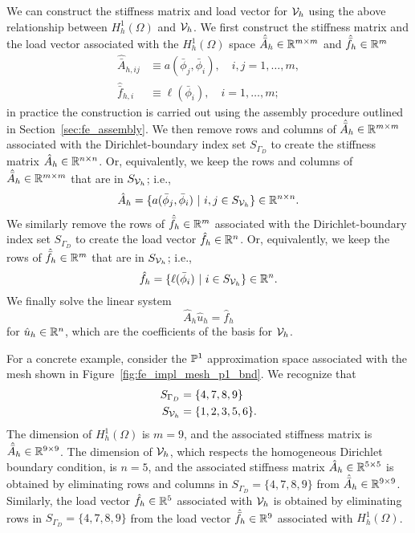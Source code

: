 We can construct the stiffness matrix and load vector for $\mathcal{V}_h$ using the above relationship between $H^1_h(\Omega)$ and $\mathcal{V}_h$.  We first construct the stiffness matrix and the load vector associated with the $H^1_h(\Omega)$ space $\hat{\bar{A}}_h \in \mathbb{R}^{m \times m}$ and $\hat{\bar{f}}_h \in \mathbb{R}^m$
\begin{align*}
  \hat{\bar{A}}_{h,ij} &\equiv a(\bar \phi_j,\bar \phi_i), \quad i,j = 1,\dots,m,\\
  \hat{\bar{f}}_{h,i} &\equiv \ell(\bar \phi_i), \quad i = 1,\dots,m;
\end{align*}
in practice the construction is carried out using the assembly procedure outlined in Section~\ref{sec:fe_assembly}. We then remove rows and columns of $\hat{\bar{A}}_{h} \in \mathbb{R}^{m \times m}$ associated with the Dirichlet-boundary index set $S_{\Gamma_D}$ to create the stiffness matrix $\hat A_h \in \mathbb{R}^{n \times n}$. Or, equivalently, we keep the rows and columns of $\hat{\bar A}_h \in \mathbb{R}^{m \times m}$ that are in $S_{\mathcal{V}_h}$; i.e.,
\begin{equation}
  \hat A_h  = \{ a(\bar \phi_j, \bar \phi_i) \ | \ i,j \in S_{\mathcal{V}_h} \}\in \mathbb{R}^{n \times n}.
  \label{eq:fe_impl_hatAh_dir}
\end{equation}
We similarly remove the rows of $\hat{\bar{f}}_h \in \mathbb{R}^m$ associated with the Dirichlet-boundary index set $S_{\Gamma_D}$ to create the load vector $\hat f_h \in \mathbb{R}^n$. Or, equivalently, we keep the rows of $\hat{\bar f}_h \in \mathbb{R}^{m}$ that are in $S_{\mathcal{V}_h}$; i.e.,
\begin{equation}
  \hat f_h  = \{ \ell(\bar \phi_i) \ | \ i \in S_{\mathcal{V}_h} \}\in \mathbb{R}^{n}.
  \label{eq:fe_impl_hatfh_dir}
\end{equation}
We finally solve the linear system
\begin{equation*}
  \hat A_h \hat u_h = \hat f_h
\end{equation*}
for $\hat u_h \in \mathbb{R}^n$, which are the coefficients of the basis for $\mathcal{V}_h$.

For a concrete example, consider the $\mathbb{P}^1$ approximation space associated with the mesh shown in Figure~\ref{fig:fe_impl_mesh_p1_bnd}. We recognize that
\begin{align*}
  S_{\Gamma_D} &= \{ 4,7,8,9 \} \\
  S_{\mathcal{V}_h} &= \{ 1,2,3,5,6\}.
\end{align*}
The dimension of $H^1_h(\Omega)$ is $m = 9$, and the associated stiffness matrix is $\hat{\bar A}_h \in \mathbb{R}^{9 \times 9}$.  The dimension of $\mathcal{V}_h$, which respects the homogeneous Dirichlet boundary condition, is $n = 5$, and the associated stiffness matrix $\hat A_h \in \mathbb{R}^{5 \times 5}$ is obtained by eliminating rows and columns in $S_{\Gamma_D} = \{4, 7, 8, 9\}$ from $\hat{\bar A}_h \in \mathbb{R}^{9 \times 9}$.  Similarly, the load vector $\hat f_h \in \mathbb{R}^5$ associated with $\mathcal{V}_h$ is obtained by eliminating rows in $S_{\Gamma_D} = \{4, 7, 8, 9\}$  from the load vector $\hat{\bar f}_h \in \mathbb{R}^9$ associated with $H^1_h(\Omega)$.

